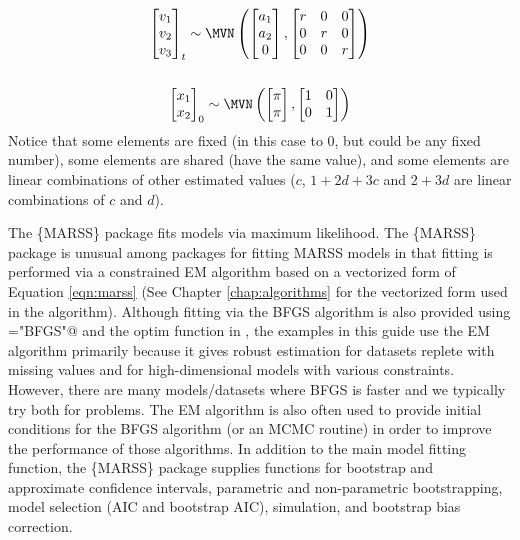 \begin{gather*}
\begin{bmatrix}v_1\\ v_2\\ v_3\end{bmatrix}_t \sim \MVN\begin{pmatrix}\begin{bmatrix}a_1\\ a_2\\ 0\end{bmatrix},
 \begin{bmatrix}r&0&0\\0&r&0\\0&0&r\end{bmatrix} \end{pmatrix}  \\
\\
\begin{bmatrix}x_1\\ x_2\end{bmatrix}_0 \sim \MVN\begin{pmatrix}\begin{bmatrix}\pi\\ \pi\end{bmatrix},\begin{bmatrix}1&0\\ 0&1\end{bmatrix} \end{pmatrix}
\end{gather*}
Notice that some elements are fixed (in this case to 0, but could be any fixed number), some elements are shared (have the same value), and some elements are linear combinations of other estimated values ($c$, $1+2d+3c$ and $2+3d$ are linear combinations of $c$ and $d$).

The \{MARSS\} package fits models via maximum likelihood. The \{MARSS\} package is unusual among packages for fitting MARSS models in that fitting is performed via a constrained EM algorithm \citep{Holmes2010} based on a vectorized form of Equation \ref{eqn:marss} (See Chapter \ref{chap:algorithms} for the vectorized form used in the algorithm).  Although fitting via the BFGS algorithm is also provided using \verb@method="BFGS"@ and the optim function in \R, the examples in this guide use the EM algorithm primarily because it gives robust estimation for datasets replete with missing values and for high-dimensional models with various constraints. However, there are many models/datasets where BFGS is faster and we typically try both for problems.  The EM algorithm is also often used to provide initial conditions for the BFGS algorithm (or an MCMC routine) in order to improve the performance of those algorithms.  In addition to the main model fitting function, the \{MARSS\} package  supplies functions for bootstrap and approximate confidence intervals, parametric and non-parametric bootstrapping, model selection (AIC and bootstrap AIC), simulation, and bootstrap bias correction.

